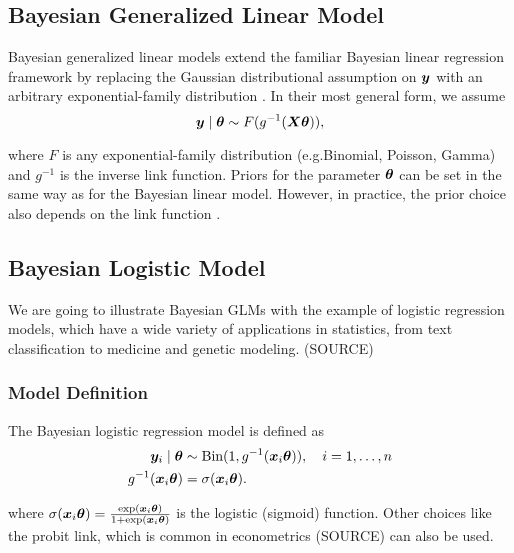 \subsection{Bayesian Generalized Linear Model}\label{sec:logit-glm}

Bayesian generalized linear models extend the familiar Bayesian linear regression framework by replacing the Gaussian distributional assumption on $\bm{y}$ with an arbitrary exponential-family distribution \citep{nelder_generalized_1972,west_dynamic_1985}. 
In their most general form, we assume
\begin{equation*}
    \bm{y} \mid \bm{\theta} \sim F(g^{-1}(\bm{X} \bm{\theta})),
\end{equation*}

where $F$ is any exponential-family distribution (e.g.\@ Binomial, Poisson, Gamma) and $g^{-1}$ is the inverse link function.
Priors for the parameter $\bm{\theta}$ can be set in the same way as for the Bayesian linear model. However, in practice, the prior choice also depends on the link function \citep{west_dynamic_1985}.

\subsection{Bayesian Logistic Model} \label{sec:logit-logit}

We are going to illustrate Bayesian GLMs with the example of logistic regression models, which have a wide variety of applications in statistics, from text classification to medicine and genetic modeling. (SOURCE)

\subsubsection*{Model Definition}

The Bayesian logistic regression model is defined as
\begin{equation}\label{eq:logit}
    \begin{aligned}
        \bm{y}_i \mid \bm{\theta} &\sim \text{Bin}(1, g^{-1}(\bm{x}_i \bm{\theta})), \quad i = 1, \dots, n \\
        g^{-1}(\bm{x}_i \bm{\theta}) &= \sigma(\bm{x}_i \bm{\theta}).
    \end{aligned}
\end{equation}

where $\sigma(\bm{x}_i \bm{\theta}) = \frac{\exp(\bm{x}_i \bm{\theta})}{1 + \exp(\bm{x}_i \bm{\theta})}$ is the logistic (sigmoid) function.  Other choices like the probit link, which is common in econometrics (SOURCE) can also be used.

